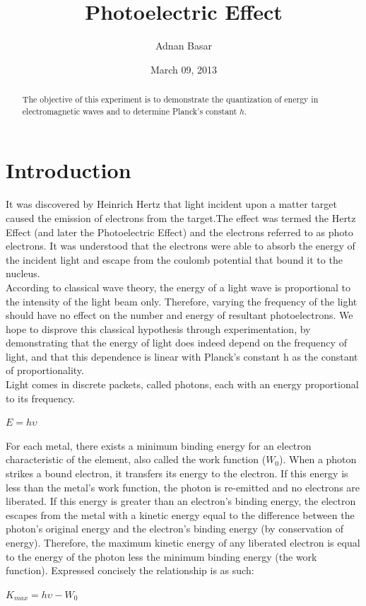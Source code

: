 \documentclass[aps,nofootinbib,onecolumn,groupedaddress,a4paper]{revtex4}
\begin{document}
\title{Photoelectric Effect} 

\author{Adnan Basar}


\date{March 09, 2013}

\begin{abstract}
The objective of this experiment is to demonstrate the quantization of energy in electromagnetic
waves and to determine Planck's constant $h$.
\end{abstract}

\maketitle


\section{Introduction}
It was discovered by Heinrich Hertz that light incident
upon a matter target caused the emission of electrons
from the target.The effect was termed the Hertz Effect
(and later the Photoelectric Effect) and the electrons referred to as photo electrons. It was understood that the
electrons were able to absorb the energy of the incident
light and escape from the coulomb potential that bound
it to the nucleus.\\

According to classical wave theory, the energy of a
light wave is proportional to the intensity of the light
beam only. Therefore, varying the frequency of the light
should have no effect on the number and energy of resultant photoelectrons. We hope to disprove this classical hypothesis through experimentation, by demonstrating that the energy of light does indeed depend on the frequency of light, and that this dependence is linear with Planck’s constant h as the constant of proportionality.\\

Light comes in discrete packets, called photons, each
with an energy proportional to its frequency.
\begin{center}
$E=h\upsilon$
\end{center}

For each metal, there exists a minimum binding energy
for an electron characteristic of the element, also called
the work function (${W}_{0}$). When a photon strikes a bound
electron, it transfers its energy to the electron. If this
energy is less than the metal’s work function, the photon
is re-emitted and no electrons are liberated. If this energy
is greater than an electron’s binding energy, the electron
escapes from the metal with a kinetic energy equal to
the difference between the photon’s original energy and
the electron’s binding energy (by conservation of energy).
Therefore, the maximum kinetic energy of any liberated
electron is equal to the energy of the photon less the
minimum binding energy (the work function). Expressed
concisely the relationship is as such:
\begin{center}
${K}_{max}=h\upsilon-{W}_{0}$
\end{center}
\end{document}
